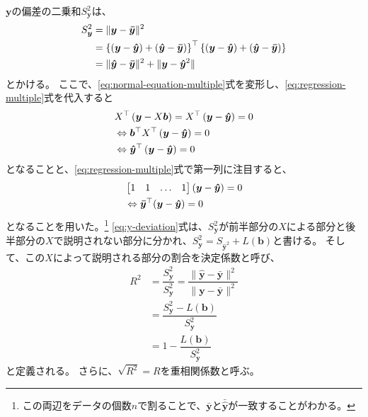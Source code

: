$\bm{y}$の偏差の二乗和$S_{\bm{y}}^2$は、
\begin{align}\label{eq:y-deviation}
	S_{\bm{y}}^2 & = \| \bm{y} - \bm{\bar{y}} \|^2 \nonumber                                                                                                                         \\
	             & = \left\{ (\bm{y}-\bm{\hat{y}}) + (\bm{\hat{y}} - \bm{\bar{y}}) \right\}^{\top} \left\{  (\bm{y}-\bm{\hat{y}}) + (\bm{\hat{y}} - \bm{\bar{y}})\right\} \nonumber \\
	             & = \| \bm{\hat{y}} - \bm{\bar{y}} \|^2 + \| \bm{y} - \bm{\hat{y}}^2 \|
\end{align}
とかける。
ここで、\ref{eq:normal-equation-multiple}式を変形し、\ref{eq:regression-multiple}式を代入すると
\begin{equation}
	\begin{split}
		 & X^{\top} \left( \bm{y} - X\bm{b} \right) = X^{\top} \left( \bm{y} - \bm{\hat{y}} \right) = 0 \\
		 & \Leftrightarrow \bm{b}^{\top}X^{\top} \left( \bm{y} - \bm{\hat{y}} \right) = 0               \\
		 & \Leftrightarrow \bm{\hat{y}}^{\top} \left( \bm{y} - \bm{\hat{y}} \right) = 0                  \\
	\end{split}
\end{equation}
となることと、\ref{eq:regression-multiple}式で第一列に注目すると、
\begin{equation}\label{eq:regression-mean}
	\begin{split}
		 & \begin{bmatrix}1 & 1 & \dots & 1 \end{bmatrix}
		(\bm{y} - \bm{\hat{y}}) = 0                                         \\
		 & \Leftrightarrow \bm{\bar{y}}^{\top} (\bm{y} - \bm{\hat{y}}) = 0
	\end{split}
\end{equation}
となることを用いた。\footnote{
	この両辺をデータの個数$n$で割ることで、$\bar{\bm{y}}$と$\bar{\bm{\hat{y}}}$が一致することがわかる。
}
\ref{eq:y-deviation}式は、$S_{\bm{y}}^2$が前半部分の$X$による部分と後半部分の$X$で説明されない部分に分かれ、$S_{\bm{y}}^2 = S_{\bm{\hat{y}}^2} + L(\bm{b})$と書ける。
そして、この$X$によって説明される部分の割合を決定係数と呼び、
\begin{align}\label{eq:coefficent-determination}
	R^2 & = \dfrac{S_{\bm{\hat{y}}}^2}{S_{\bm{y}}^2} = \dfrac{\| \bm{\hat{y}} - \bm{\bar{y}} \|^2}{\| \bm{y} - \bm{\bar{y}} \|^2} \\
	    & = \dfrac{S_{\bm{y}}^2  - L(\bm{b})}{S_{\bm{y}}^2} \nonumber                                                             \\
	    & = 1 - \dfrac{L(\bm{b})}{S_{\bm{y}}^2}
\end{align}
と定義される。
さらに、$\sqrt{R^2}=R$を重相関係数と呼ぶ。
